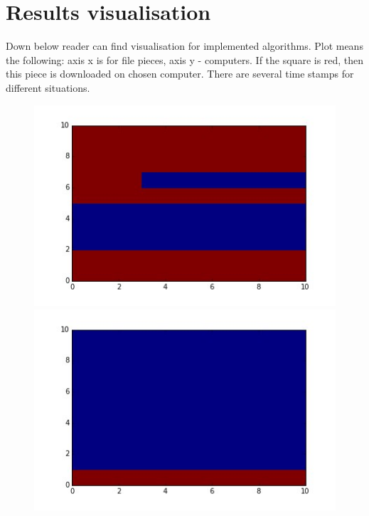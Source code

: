 \documentclass[10pt,a4paper]{article}
\begin{document}
\section*{Results visualisation}

Down below reader can find visualisation for implemented algorithms. Plot means the following: axis x is for file pieces, axis y - computers. If the square is red, then this piece is downloaded on chosen computer. There are several time stamps for different situations.

\begin{figure}
	\includegraphics[scale=0.5]{pics/001} \includegraphics[scale=0.5]{pics/008} \\

\end{figure}
\end{document}
